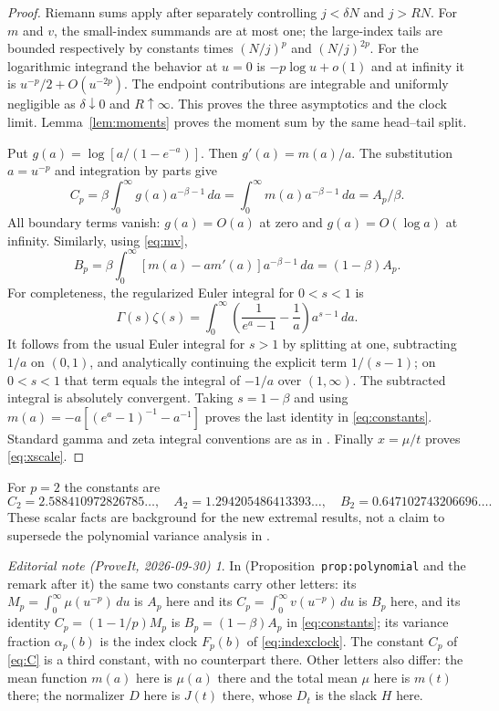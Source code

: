 \documentclass[11pt,a4paper]{article}
\numberwithin{equation}{section}
\theoremstyle{definition}
\theoremstyle{remark}
\newtheorem*{ednote}{Editorial note (ProveIt, 2026-09-30)}
\begin{document}
\begin{proof}
Riemann sums apply after separately controlling $j<\delta N$ and
$j>RN$. For $m$ and $v$, the small-index summands are at most one; the
large-index tails are bounded respectively by constants times
$(N/j)^p$ and $(N/j)^{2p}$. For the logarithmic integrand the behavior
at $u=0$ is $-p\log u+o(1)$ and at infinity it is
$u^{-p}/2+O(u^{-2p})$. The endpoint contributions are integrable and
uniformly negligible as $\delta\downarrow0$ and $R\uparrow\infty$.
This proves the three asymptotics and the clock limit. Lemma~\ref{lem:moments}
proves the moment sum by the same head--tail split.

Put $g(a)=\log[a/(1-e^{-a})]$. Then $g'(a)=m(a)/a$.
The substitution $a=u^{-p}$ and integration by parts give
\[
 C_p=\beta\int_0^\infty g(a)a^{-\beta-1}\,da
     =\int_0^\infty m(a)a^{-\beta-1}\,da=A_p/\beta.
\]
All boundary terms vanish: $g(a)=O(a)$ at zero and $g(a)=O(\log a)$
at infinity. Similarly, using \eqref{eq:mv},
\[
 B_p=\beta\int_0^\infty[m(a)-am'(a)]a^{-\beta-1}\,da
     =(1-\beta)A_p.
\]
For completeness, the regularized Euler integral for $0<s<1$ is
\begin{equation}
 \Gamma(s)\zeta(s)=\int_0^\infty
 \left(\frac1{e^a-1}-\frac1a\right)a^{s-1}\,da.
 \label{eq:zeta-reg}
\end{equation}
It follows from the usual Euler integral for $s>1$ by splitting at one,
subtracting $1/a$ on $(0,1)$, and analytically continuing the explicit
term $1/(s-1)$; on $0<s<1$ that term equals the integral of $-1/a$
over $(1,\infty)$. The subtracted integral is absolutely convergent.
Taking $s=1-\beta$ and using
$m(a)=-a[(e^a-1)^{-1}-a^{-1}]$ proves the last identity in
\eqref{eq:constants}. Standard gamma and zeta integral conventions are
as in \cite{dlmf}. Finally $x=\mu/t$ proves \eqref{eq:xscale}.
\end{proof}
For $p=2$ the constants are
\[
 C_2=2.588410972826785\ldots,\quad
 A_2=1.294205486413393\ldots,\quad
 B_2=0.647102743206696\ldots.
\]
These scalar facts are background for the new extremal results, not a
claim to supersede the polynomial variance analysis in \cite{repounif}.
\begin{ednote}
In \cite{repounif} (Proposition~\texttt{prop:polynomial} and the remark
after it) the same two constants carry other letters: its
$M_p=\int_0^\infty\mu(u^{-p})\,du$ is $A_p$ here and its
$C_p=\int_0^\infty v(u^{-p})\,du$ is $B_p$ here, and its identity
$C_p=(1-1/p)M_p$ is $B_p=(1-\beta)A_p$ in \eqref{eq:constants}; its
variance fraction $\alpha_p(b)$ is the index clock $F_p(b)$ of
\eqref{eq:indexclock}. The constant $C_p$ of \eqref{eq:C} is a third
constant, with no counterpart there. Other letters also differ: the mean
function $m(a)$ here is $\mu(a)$ there and the total mean $\mu$ here is
$m(t)$ there; the normalizer $D$ here is $J(t)$ there, whose $D_t$ is the
slack $H$ here.
\end{ednote}
\end{document}
